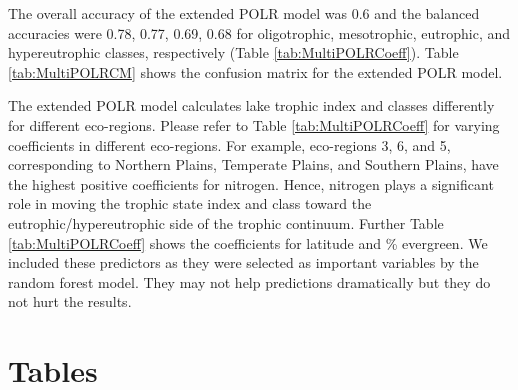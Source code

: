 \documentclass[fleqn,10pt,lineno]{wlpeerj} %
\begin{document}
The overall accuracy of the extended POLR model was 0.6 and the balanced accuracies were 0.78, 0.77, 0.69, 0.68 for oligotrophic, mesotrophic, eutrophic, and hypereutrophic classes, respectively (Table \ref{tab:MultiPOLRCoeff}). Table \ref{tab:MultiPOLRCM} shows the confusion matrix for the extended POLR model.

The extended POLR model calculates lake trophic index and classes differently for different eco-regions. Please refer to Table \ref{tab:MultiPOLRCoeff} for varying coefficients in different eco-regions. For example, eco-regions 3, 6, and 5, corresponding to Northern Plains, Temperate Plains, and Southern Plains, have the highest positive coefficients for nitrogen. Hence, nitrogen plays a significant role in moving the trophic state index and class toward the eutrophic/hypereutrophic side of the trophic continuum. Further Table \ref{tab:MultiPOLRCoeff} shows the coefficients for latitude and \% evergreen. We included these predictors as they were selected as important variables by the random forest model. They may not help predictions dramatically but they do not hurt the results.

\hypertarget{tables}{%
\section*{Tables}\label{tables}}
\end{document}
